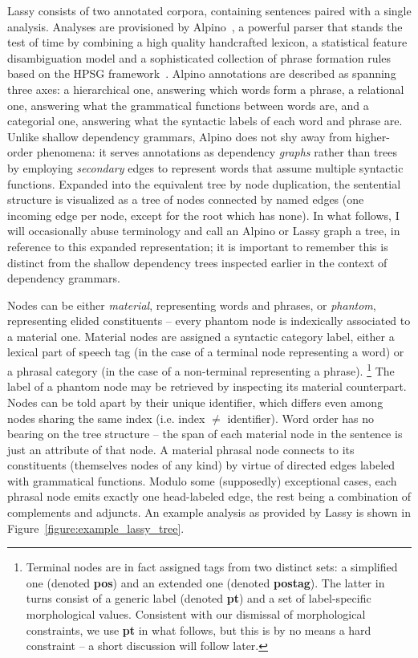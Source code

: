 Lassy consists of two annotated corpora, containing sentences paired with a single analysis.
Analyses are provisioned by Alpino~\cite{van2006last}, a powerful parser that stands the test of time by combining a high quality handcrafted lexicon, a statistical feature disambiguation model and a sophisticated collection of phrase formation rules based on the HPSG framework~\cite{pollard1994head}.
Alpino annotations are described as spanning three axes: a hierarchical one, answering which words form a phrase, a relational one, answering what the grammatical functions between words are, and a categorial one, answering what the syntactic labels of each word and phrase are.
Unlike shallow dependency grammars, Alpino does not shy away from higher-order phenomena: it serves annotations as dependency \textit{graphs} rather than trees by employing \textit{secondary} edges to represent words that assume multiple syntactic functions.
Expanded into the equivalent tree by node duplication, the sentential structure is visualized as a tree of nodes connected by named edges (one incoming edge per node, except for the root which has none).
In what follows, I will occasionally abuse terminology and call an Alpino or Lassy graph a tree, in reference to this expanded representation; it is important to remember this is distinct from the shallow dependency trees inspected earlier in the context of dependency grammars.

Nodes can be either \textit{material}, representing words and phrases, or \textit{phantom}, representing elided constituents -- every phantom node is indexically associated to a material one.
Material nodes are assigned a syntactic category label, either a lexical part of speech tag (in the case of a terminal node representing a word) or a phrasal category (in the case of a non-terminal representing a phrase).%
	\footnote{Terminal nodes are in fact assigned tags from two distinct sets: a simplified one (denoted \textbf{pos}) and an extended one (denoted \textbf{postag}). The latter in turns consist of a generic label (denoted \textbf{pt}) and a set of label-specific morphological values.
	Consistent with our dismissal of morphological constraints, we use \textbf{pt} in what follows, but this is by no means a hard constraint -- a short discussion will follow later.}
The label of a phantom node may be retrieved by inspecting its material counterpart.
Nodes can be told apart by their unique identifier, which differs even among nodes sharing the same index (i.e. index $\neq$ identifier).
Word order has no bearing on the tree structure -- the span of each material node in the sentence is just an attribute of that node.
A material phrasal node connects to its constituents (themselves nodes of any kind) by virtue of directed edges labeled with grammatical functions.
Modulo some (supposedly) exceptional cases, each phrasal node emits exactly one head-labeled edge, the rest being a combination of complements and adjuncts.
An example analysis as provided by Lassy is shown in Figure~\ref{figure:example_lassy_tree}.%

